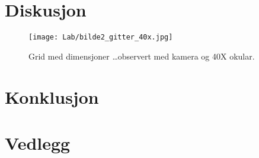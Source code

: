 \documentclass[a4paper,11pt, twocolumn]{article}
\begin{document}
\section{Diskusjon}
\begin{figure}[!ht]
	\centering
	\texttt{[image: Lab/bilde2\_gitter\_40x.jpg]}
	\caption{Grid med dimensjoner \ldots observert med kamera og 40X okular.}
	\label{fig:grid40x}
\end{figure}

\section{Konklusjon}

\printbibliography{}
\clearpage
\onecolumn
\appendix

\section{Vedlegg}
\end{document}
